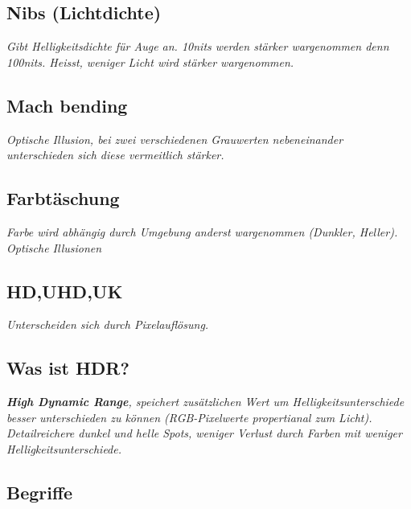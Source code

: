 \subsection{Nibs (Lichtdichte)}

\textit{
    Gibt Helligkeitsdichte für Auge an. 10nits werden stärker wargenommen denn 100nits.
    Heisst, weniger Licht wird stärker wargenommen.
}

\subsection{Mach bending}

\textit{
    Optische Illusion, bei zwei verschiedenen Grauwerten nebeneinander
    unterschieden sich diese vermeitlich stärker.
}

\subsection{Farbtäschung}

\textit{
    Farbe wird abhängig durch Umgebung anderst wargenommen
    (Dunkler, Heller). Optische Illusionen
}

\subsection{HD,UHD,UK}

\textit{Unterscheiden sich durch Pixelauflösung.}

\subsection{Was ist HDR?}

\textit{
    \textbf{High Dynamic Range}, speichert zusätzlichen Wert um
    Helligkeitsunterschiede besser unterschieden zu können
    (RGB-Pixelwerte propertianal zum Licht).
    Detailreichere dunkel und helle Spots, weniger Verlust
    durch Farben mit weniger Helligkeitsunterschiede.
}

\subsection{Begriffe}

